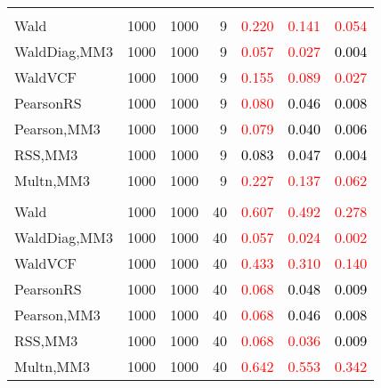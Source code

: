 \documentclass[
]{article}
\begin{document}
\begin{table}[H]
{\begin{tabular}[t]{lrrrrrr}
\addlinespace[0.3em]
\multicolumn{7}{l}{\textbf{2F 10V}}\\
\hspace{1em}Wald & 1000 & 1000 & 9 & \textcolor{red}{0.220} & \textcolor{red}{0.141} & \textcolor{red}{0.054}\\
\hspace{1em}WaldDiag,MM3 & 1000 & 1000 & 9 & \textcolor{red}{0.057} & \textcolor{red}{0.027} & \textcolor{black}{0.004}\\
\hspace{1em}WaldVCF & 1000 & 1000 & 9 & \textcolor{red}{0.155} & \textcolor{red}{0.089} & \textcolor{red}{0.027}\\
\hspace{1em}PearsonRS & 1000 & 1000 & 9 & \textcolor{red}{0.080} & \textcolor{black}{0.046} & \textcolor{black}{0.008}\\
\hspace{1em}Pearson,MM3 & 1000 & 1000 & 9 & \textcolor{red}{0.079} & \textcolor{black}{0.040} & \textcolor{black}{0.006}\\
\hspace{1em}RSS,MM3 & 1000 & 1000 & 9 & \textcolor{black}{0.083} & \textcolor{black}{0.047} & \textcolor{black}{0.004}\\
\hspace{1em}Multn,MM3 & 1000 & 1000 & 9 & \textcolor{red}{0.227} & \textcolor{red}{0.137} & \textcolor{red}{0.062}\\
\addlinespace[0.3em]
\multicolumn{7}{l}{\textbf{3F 15V}}\\
\hspace{1em}Wald & 1000 & 1000 & 40 & \textcolor{red}{0.607} & \textcolor{red}{0.492} & \textcolor{red}{0.278}\\
\hspace{1em}WaldDiag,MM3 & 1000 & 1000 & 40 & \textcolor{red}{0.057} & \textcolor{red}{0.024} & \textcolor{red}{0.002}\\
\hspace{1em}WaldVCF & 1000 & 1000 & 40 & \textcolor{red}{0.433} & \textcolor{red}{0.310} & \textcolor{red}{0.140}\\
\hspace{1em}PearsonRS & 1000 & 1000 & 40 & \textcolor{red}{0.068} & \textcolor{black}{0.048} & \textcolor{black}{0.009}\\
\hspace{1em}Pearson,MM3 & 1000 & 1000 & 40 & \textcolor{red}{0.068} & \textcolor{black}{0.046} & \textcolor{black}{0.008}\\
\hspace{1em}RSS,MM3 & 1000 & 1000 & 40 & \textcolor{red}{0.068} & \textcolor{red}{0.036} & \textcolor{black}{0.009}\\
\hspace{1em}Multn,MM3 & 1000 & 1000 & 40 & \textcolor{red}{0.642} & \textcolor{red}{0.553} & \textcolor{red}{0.342}\\
\bottomrule
\end{tabular}}
\endgroup{}
\end{table}
\end{document}
